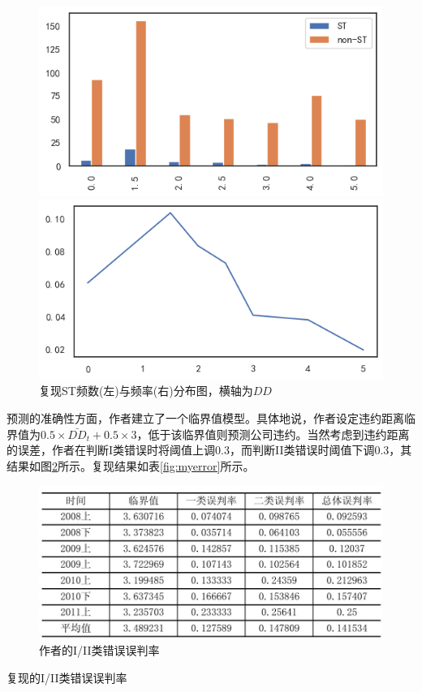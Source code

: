 \documentclass[a4paper,12pt]{ctexart}
\begin{document}
\begin{figure}[H]
    \begin{minipage}{0.48\linewidth}
        \includegraphics[width=\linewidth]{img/fig2_.png}
    \end{minipage}
    \begin{minipage}{0.48\linewidth}
        \includegraphics[width=\linewidth]{img/fig3_.png}
    \end{minipage}
    \caption{复现ST频数(左)与频率(右)分布图，横轴为$DD$}\label{fig:23}
\end{figure}

预测的准确性方面，作者建立了一个临界值模型。具体地说，作者设定违约距离临界值为$0.5\times \bar{DD}_t+0.5\times 3$，低于该临界值则预测公司违约。当然考虑到违约距离的误差，作者在判断I类错误时将阈值上调0.3，而判断II类错误时阈值下调0.3，其结果如图\ref{fig:error}所示。复现结果如表\ref{fig:myerror}所示。
\begin{figure}[H]
    \includegraphics[width=\linewidth]{img/tab1.jpeg}
    \caption{作者的I/II类错误误判率}\label{fig:error}
\end{figure}
\begin{table}[H]
    \centering
    
    \caption{复现的I/II类错误误判率}\label{fig:myerror}
\end{table}
\end{document}
